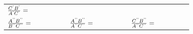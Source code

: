 {\begin{tabular}[t]{|l|l|l|}
                \begin{math}\frac{{C}^{\text{'}}{B}^{\text{'}}}{{A}^{\text{'}}{C}^{\text{'}}}=\phantom{\rule{42.67912pt}{0ex}}\end{math}
     \tabularnewline\cline{1-1}\cline{2-2}\cline{3-3}
                \begin{math}\frac{{A}^{\text{'}\text{'}}{B}^{\text{'}\text{'}}}{{B}^{\text{'}\text{'}}{C}^{\text{'}\text{'}}}=\phantom{\rule{42.67912pt}{0ex}}\end{math}
               &
                \begin{math}\frac{{A}^{\text{'}\text{'}}{B}^{\text{'}\text{'}}}{{A}^{\text{'}\text{'}}{C}^{\text{'}\text{'}}}=\phantom{\rule{42.67912pt}{0ex}}\end{math}
               &
                \begin{math}\frac{{C}^{\text{'}\text{'}}{B}^{\text{'}\text{'}}}{{A}^{\text{'}\text{'}}{C}^{\text{'}\text{'}}}=\phantom{\rule{42.67912pt}{0ex}}\end{math}
     \tabularnewline\cline{1-1}\cline{2-2}\cline{3-3}
    \end{tabular}} %
